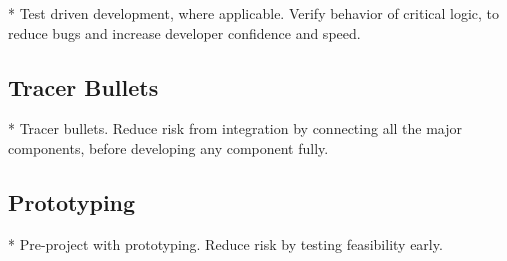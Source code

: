 * Test driven development, where applicable. Verify behavior of critical logic, to reduce bugs and increase developer confidence and speed.

\subsection{Tracer Bullets}
* Tracer bullets. Reduce risk from integration by connecting all the major components, before developing any component fully.

\subsection{Prototyping}

* Pre-project with prototyping. Reduce risk by testing feasibility early.
